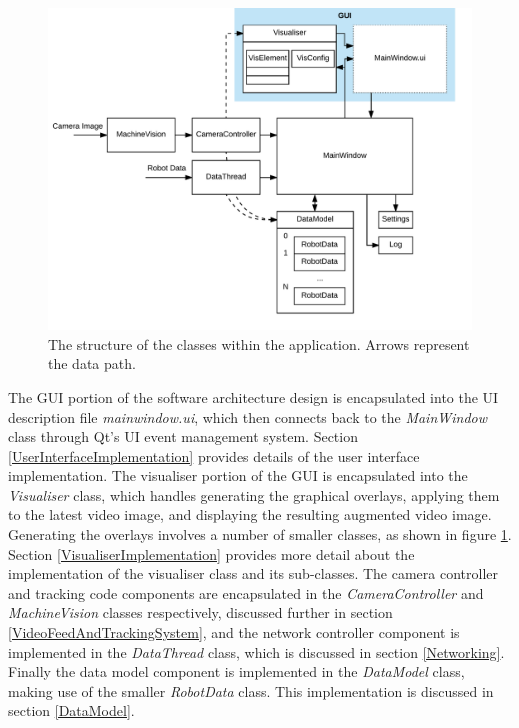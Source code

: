 \begin{figure}
	\centering
	\includegraphics[scale=0.8]{Figures/ApplicationStructure.png}
	\decoRule
	\caption[Application Structure]{The structure of the classes within the application. Arrows represent the data path.}
	\label{fig:ApplicationStructure}
\end{figure}

The GUI portion of the software architecture design is encapsulated into the UI description file \textit{mainwindow.ui}, which then connects back to the \textit{MainWindow} class through Qt's UI event management system. Section \ref{UserInterfaceImplementation} provides details of the user interface implementation. The visualiser portion of the GUI is encapsulated into the \textit{Visualiser} class, which handles generating the graphical overlays, applying them to the latest video image, and displaying the resulting augmented video image. Generating the overlays involves a number of smaller classes, as shown in figure \ref{fig:ApplicationStructure}. Section \ref{VisualiserImplementation} provides more detail about the implementation of the visualiser class and its sub-classes. The camera controller and tracking code components are encapsulated in the \textit{CameraController} and \textit{MachineVision} classes respectively, discussed further in section \ref{VideoFeedAndTrackingSystem}, and the network controller component is implemented in the \textit{DataThread} class, which is discussed in section \ref{Networking}. Finally the data model component is implemented in the \textit{DataModel} class, making use of the smaller \textit{RobotData} class. This implementation is discussed in section \ref{DataModel}.

